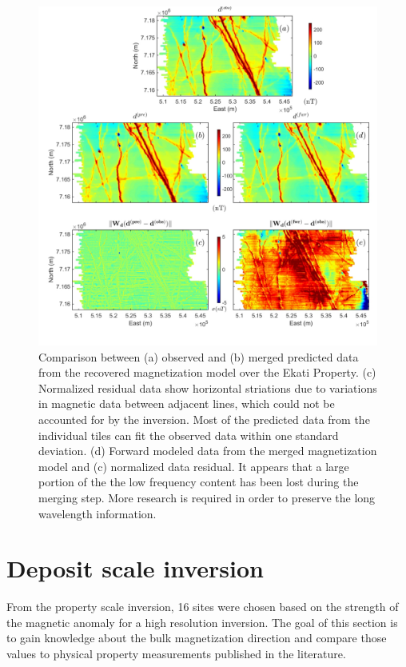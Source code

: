 \begin{figure}[h!]
\centering
\includegraphics[scale=0.6, trim=0.75cm 0 0 0]{Ekati_reg_Obs_Pred}
\caption{Comparison between (a) observed and (b) merged predicted data from the recovered magnetization model over the Ekati Property. (c) Normalized residual data show horizontal striations due to variations in magnetic data between adjacent lines, which could not be accounted for by the inversion. Most of the predicted data from the individual tiles can fit the observed data within one standard deviation. (d) Forward modeled data from the merged magnetization model and (c) normalized data residual. It appears that a large portion of the the low frequency content has been lost during the merging step. More research is required in order to preserve the long wavelength information.}
\label{fig:Ekati_reg_Obs_Pred}
\end{figure}

\section{Deposit scale inversion}
From the property scale inversion, 16 sites were chosen based on the strength of the magnetic anomaly for a high resolution inversion.
The goal of this section is to gain knowledge about the bulk magnetization direction and compare those values to physical property measurements published in the literature.

